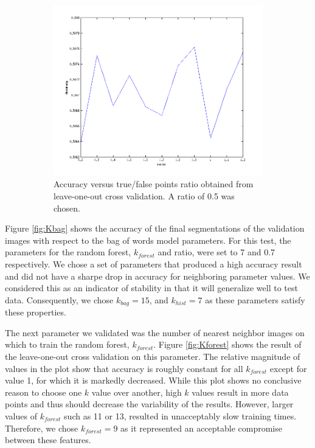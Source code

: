 \documentclass{article} %
\begin{document}
\begin{figure}[htb]
\begin{subfigure}[t]{0.33\textwidth}
	\end{subfigure}
	\begin{subfigure}[t]{0.33\textwidth}
		\centering
		\includegraphics[width = \textwidth]{./img/ratio}
		\parbox{0.95\textwidth}{\caption{Accuracy versus true/false points ratio obtained from leave-one-out cross validation. A ratio  of 0.5 was chosen. \label{fig:ratio}}}
	\end{subfigure}

	\caption{}
\end{figure}

Figure \ref{fig:Kbag} shows the accuracy of the final segmentations of the validation images with respect to the bag of words model parameters. 
For this test, the parameters for the random forest, $k_{forest}$ and ratio, were set to 7 and 0.7 respectively. 
We chose a set of parameters that produced a high accuracy result and did not have a sharpe drop in accuracy for neighboring parameter values. We considered this as an indicator of stability in that it will generalize well to test data.
Consequently, we chose $k_{bag} = 15$, and $k_{hist} = 7$ as these parameters satisfy these properties.

The next parameter we validated was the number of nearest neighbor images on which to train the random forest, $k_{forest}$. 
Figure \ref{fig:Kforest} shows the result of the leave-one-out cross validation on this parameter. The relative magnitude of values in the plot show that accuracy is roughly constant for all $k_{forest}$ except for value 1, for which it is markedly decreased. 
While this plot shows no conclusive reason to choose one $k$ value over another, high $k$ values result in more data points and thus should decrease the variability of the results. 
However, larger values of $k_{forest}$ such as 11 or 13, resulted in unacceptably slow training times. 
Therefore, we chose $k_{forest} = 9$ as it represented an acceptable compromise between these features.
\end{document}
